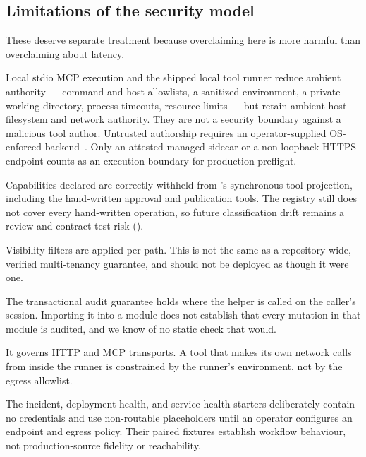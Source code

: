 \subsection{Limitations of the security model}

These deserve separate treatment because overclaiming here is more harmful than
overclaiming about latency.

 Local stdio MCP execution and the shipped local
tool runner reduce ambient authority --- command and host allowlists, a sanitized
environment, a private working directory, process timeouts, resource limits --- but
retain ambient host filesystem and network authority. They are not a security
boundary against a malicious tool author. Untrusted authorship requires an
operator-supplied OS-enforced backend~\cite{agache2020firecracker,bubblewrap}. Only
an attested managed sidecar or a non-loopback HTTPS endpoint counts as an execution
boundary for production preflight.

 Capabilities declared
 are correctly withheld from \aria{}'s synchronous tool projection,
including the hand-written approval and publication tools. The registry still does
not cover every hand-written operation, so future classification drift remains a
review and contract-test risk ().

 Visibility filters are
applied per path. This is not the same as a repository-wide, verified multi-tenancy
guarantee, and \sys should not be deployed as though it were one.

 The transactional
audit guarantee holds where the helper is called on the caller's session. Importing
it into a module does not establish that every mutation in that module is audited,
and we know of no static check that would.

 It governs HTTP and MCP
transports. A tool that makes its own network calls from inside the runner is
constrained by the runner's environment, not by the egress allowlist.

 The
incident, deployment-health, and service-health starters deliberately contain no
credentials and use non-routable placeholders until an operator configures an
endpoint and egress policy.  Their paired fixtures establish workflow behaviour,
not production-source fidelity or reachability.

